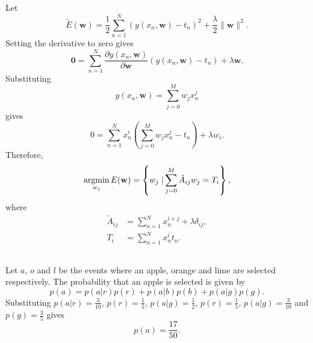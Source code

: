 \subsection{}
\label{1.2}
Let
%
\begin{equation}
\tilde{E}(\mathbf{w}) 
= 
\frac{1}{2} 
\sum_{n = 1}^{N} 
\left( 
	y(x_n, \mathbf{w}) 
	- 
	t_n 
\right) ^ 2 
+ 
\frac{\lambda}{2} 
\lVert \mathbf{w} \rVert ^ 2.
\end{equation}
%
Setting the derivative to zero gives
%
\begin{equation}
\mathbf{0} 
= 
\sum_{n = 1}^{N} 
\frac{\partial y(x_n, \mathbf{w})}{\partial \mathbf{w}} 
\left( 
	y(x_n, \mathbf{w}) 
	- 
	t_n 
\right) 
+ 
\lambda 
\mathbf{w}.
\end{equation}
%
Substituting 
%
\begin{equation}
y(x_n, \mathbf{w}) 
= 
\sum_{j = 0}^{M} 
w_j 
x_n ^ j
\end{equation}
%
gives
%
\begin{equation}
0 
= 
\sum_{n = 1}^{N} 
x_n ^ i 
\left( 
	\sum_{j = 0}^{M} 
	w_j 
	x_n ^ j 
	- 
	t_n 
\right) 
+ 
\lambda 
w_i.
\end{equation}
%
Therefore,
%
\begin{equation}
\operatorname*{arg min}_{w_j}
E(\mathbf{w})
=
\left \{
	w_j
	\left.
	\right \vert
	\sum_{j = 0}^{M} 
	\tilde{A}_{ij} 
	w_j 
	= 
	T_i	
\right \},
\end{equation}
%
where
%
\begin{equation}
\begin{aligned}
\tilde{A}_{ij} 
&= 
\sum_{n = 1}^{N} 
x_n ^ {i + j} 
+ 
\lambda 
\delta_{ij}, \\
T_i 
&= 
\sum_{n = 1}^{N} 
x_n ^ i 
t_n.
\end{aligned}
\end{equation}


\subsection{}
\label{1.3}
Let $a$, $o$ and $l$ be the events where an apple, orange and lime are selected respectively.
The probability that an apple is selected is given by
%
\begin{equation}
p(a) 
= 
p(a | r) 
p(r) 
+ 
p(a | b) 
p(b) 
+ 
p(a | g) 
p(g).
\end{equation}
%
Substituting 
$p(a | r) = \frac{3}{10}$, 
$p(r) = \frac{1}{5}$, 
$p(a | g) = \frac{1}{2}$, 
$p(r) = \frac{1}{5}$, 
$p(a | g) = \frac{3}{10}$ 
and 
$p(g) = \frac{3}{5}$ 
gives
%
\begin{equation}
p(a) 
= 
\frac{17}{50}.
\end{equation}
%

